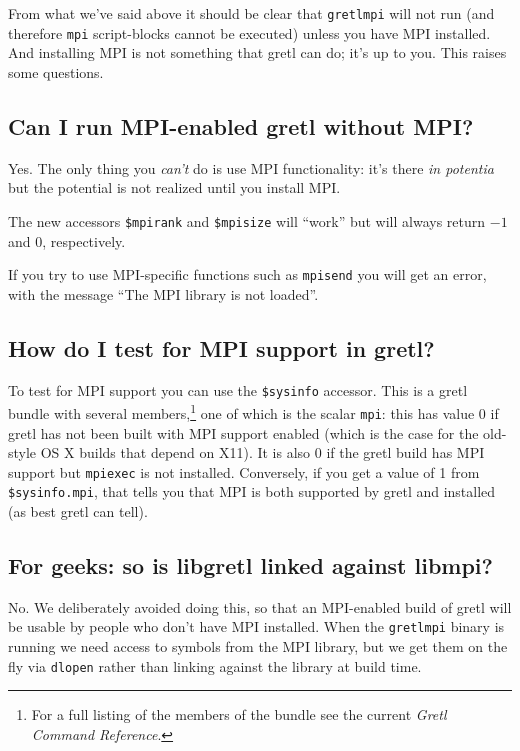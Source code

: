 \documentclass{article}
\begin{document}
From what we've said above it should be clear that \texttt{gretlmpi}
will not run (and therefore \texttt{mpi} script-blocks cannot be
executed) unless you have MPI installed. And installing MPI is not
something that gretl can do; it's up to you. This raises some
questions.

\subsection{Can I run MPI-enabled gretl without MPI?}

Yes. The only thing you \textit{can't} do is use MPI functionality:
it's there \textit{in potentia} but the potential is not realized
until you install MPI.

The new accessors \verb|$mpirank| and \verb|$mpisize| will ``work''
but will always return $-1$ and $0$, respectively.

If you try to use MPI-specific functions such as \texttt{mpisend} you
will get an error, with the message ``The MPI library is not loaded''.

\subsection{How do I test for MPI support in gretl?}
\label{subsec:mpi-test}

To test for MPI support you can use the
\verb|$sysinfo| accessor. This is a gretl bundle with several
members,\footnote{For a full listing of the members of the bundle see
  the current \textit{Gretl Command Reference}.} one of which is the
scalar \texttt{mpi}: this has value 0 if gretl has not been built with
MPI support enabled (which is the case for the old-style OS X builds
that depend on X11). It is also 0 if the gretl build has MPI support
but \texttt{mpiexec} is not installed.  Conversely, if you get a value
of 1 from \verb|$sysinfo.mpi|, that tells you that MPI is both
supported by gretl and installed (as best gretl can tell).

\subsection{For geeks: so is libgretl linked against libmpi?}

No. We deliberately avoided doing this, so that an MPI-enabled build
of gretl will be usable by people who don't have MPI installed.  When
the \texttt{gretlmpi} binary is running we need access to symbols from
the MPI library, but we get them on the fly via \texttt{dlopen} rather
than linking against the library at build time.
\end{document}
